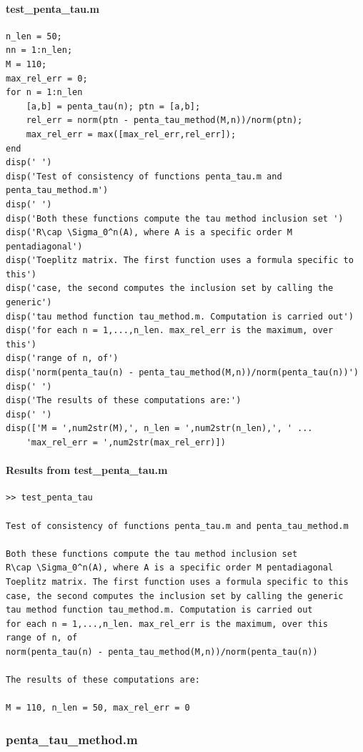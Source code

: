 \documentclass[preprint,1p,11pt]{elsarticle}
\numberwithin{equation}{section}   %
\numberwithin{figure}{section}  %
\begin{document}
\paragraph{test\_penta\_tau.m}
\begin{verbatim}
n_len = 50;
nn = 1:n_len;
M = 110;
max_rel_err = 0;
for n = 1:n_len
    [a,b] = penta_tau(n); ptn = [a,b];
    rel_err = norm(ptn - penta_tau_method(M,n))/norm(ptn);
    max_rel_err = max([max_rel_err,rel_err]);
end
disp(' ')
disp('Test of consistency of functions penta_tau.m and penta_tau_method.m')
disp(' ')
disp('Both these functions compute the tau method inclusion set ')
disp('R\cap \Sigma_0^n(A), where A is a specific order M pentadiagonal')
disp('Toeplitz matrix. The first function uses a formula specific to this')
disp('case, the second computes the inclusion set by calling the generic')
disp('tau method function tau_method.m. Computation is carried out')
disp('for each n = 1,...,n_len. max_rel_err is the maximum, over this')
disp('range of n, of')
disp('norm(penta_tau(n) - penta_tau_method(M,n))/norm(penta_tau(n))')
disp(' ')
disp('The results of these computations are:')
disp(' ')
disp(['M = ',num2str(M),', n_len = ',num2str(n_len),', ' ...
    'max_rel_err = ',num2str(max_rel_err)])
\end{verbatim}

\paragraph{Results from test\_penta\_tau.m}

\begin{verbatim}
>> test_penta_tau
 
Test of consistency of functions penta_tau.m and penta_tau_method.m
 
Both these functions compute the tau method inclusion set 
R\cap \Sigma_0^n(A), where A is a specific order M pentadiagonal
Toeplitz matrix. The first function uses a formula specific to this
case, the second computes the inclusion set by calling the generic
tau method function tau_method.m. Computation is carried out
for each n = 1,...,n_len. max_rel_err is the maximum, over this
range of n, of
norm(penta_tau(n) - penta_tau_method(M,n))/norm(penta_tau(n))
 
The results of these computations are:
 
M = 110, n_len = 50, max_rel_err = 0
\end{verbatim}

\subsubsection{penta\_tau\_method.m} \label{code:ptm}
\end{document}
